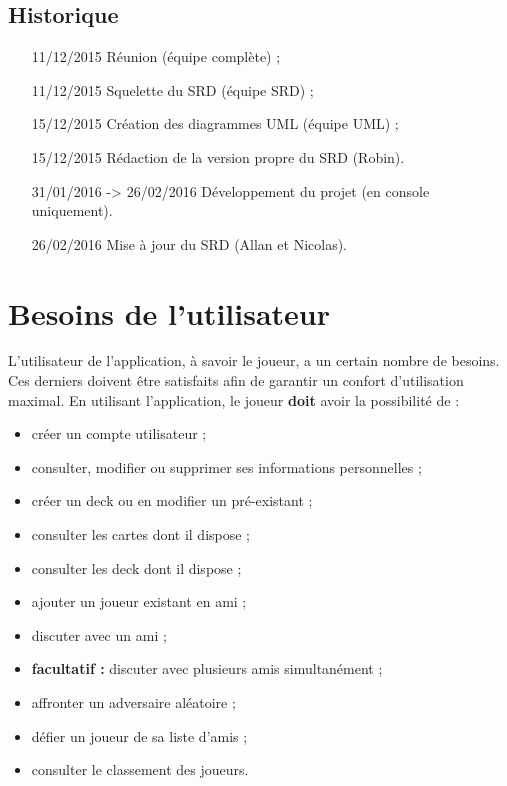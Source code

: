 \documentclass{article}
\begin{document}
	\subsection{Historique}
		\begin{itemize}
			\item[11/12/2015] Réunion (équipe complète) ;
			\item[11/12/2015] Squelette du SRD (équipe SRD) ;
			\item[15/12/2015] Création des diagrammes UML (équipe UML) ;
			\item[15/12/2015] Rédaction de la version propre du SRD (Robin).
			\item[31/01/2016] -> 26/02/2016 Développement du projet (en console uniquement).
			\item[26/02/2016]  Mise à jour du SRD (Allan et Nicolas).
		\end{itemize}

\newpage

\section{Besoins de l'utilisateur}
	L'utilisateur de l'application, à savoir le joueur, a un certain nombre de besoins. Ces derniers doivent être satisfaits afin de garantir un confort d'utilisation
	maximal. En utilisant l'application, le joueur \textbf{doit} avoir la possibilité de :

	\begin{itemize}
		\item créer un compte utilisateur ;
		\item consulter, modifier ou supprimer ses informations personnelles ; 
		\item créer un deck ou en modifier un pré-existant ;
		\item consulter les cartes dont il dispose ;
		\item consulter les deck dont il dispose ;
		\item ajouter un joueur existant en ami ;
		\item discuter avec un ami ;
		\item \textbf{facultatif :} discuter avec plusieurs amis simultanément ;
		\item affronter un adversaire aléatoire ;
		\item défier un joueur de sa liste d'amis ;
		\item consulter le classement des joueurs.
	\end{itemize}
\end{document}

